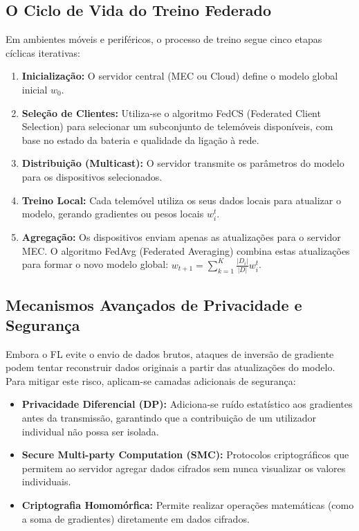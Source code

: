 \documentclass[runningheads]{llncs}
\begin{document}
\subsection{O Ciclo de Vida do Treino Federado}
Em ambientes móveis e periféricos, o processo de treino segue cinco etapas cíclicas iterativas:

\begin{enumerate}
    \item \textbf{Inicialização:} O servidor central (MEC ou Cloud) define o modelo global inicial $w_0$.
    \item \textbf{Seleção de Clientes:} Utiliza-se o algoritmo FedCS (Federated Client Selection) para selecionar um subconjunto de telemóveis disponíveis, com base no estado da bateria e qualidade da ligação à rede.
    \item \textbf{Distribuição (Multicast):} O servidor transmite os parâmetros do modelo para os dispositivos selecionados.
    \item \textbf{Treino Local:} Cada telemóvel utiliza os seus dados locais para atualizar o modelo, gerando gradientes ou pesos locais $w_i^t$.
    \item \textbf{Agregação:} Os dispositivos enviam apenas as atualizações para o servidor MEC. O algoritmo FedAvg (Federated Averaging) \cite{pmc2022} combina estas atualizações para formar o novo modelo global: $w_{t+1} = \sum_{k=1}^K \frac{|D_i|}{|D|} w_i^t$. 
\end{enumerate}

\subsection{Mecanismos Avançados de Privacidade e Segurança}
Embora o FL evite o envio de dados brutos, ataques de inversão de gradiente podem tentar reconstruir dados originais a partir das atualizações do modelo. Para mitigar este risco, aplicam-se camadas adicionais de segurança:

\begin{itemize}
    \item \textbf{Privacidade Diferencial (DP):} Adiciona-se ruído estatístico aos gradientes antes da transmissão, garantindo que a contribuição de um utilizador individual não possa ser isolada.
    \item \textbf{Secure Multi-party Computation (SMC):} Protocolos criptográficos que permitem ao servidor agregar dados cifrados sem nunca visualizar os valores individuais.
    \item \textbf{Criptografia Homomórfica:} Permite realizar operações matemáticas (como a soma de gradientes) diretamente em dados cifrados.
\end{itemize}
\end{document}
